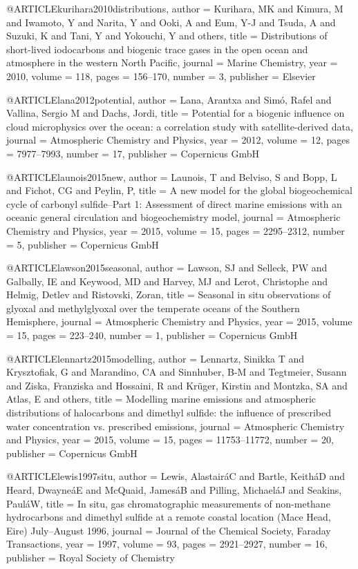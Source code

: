 @ARTICLE{kurihara2010distributions,
  author = {Kurihara, MK and Kimura, M and Iwamoto, Y and Narita, Y and Ooki,
	A and Eum, Y-J and Tsuda, A and Suzuki, K and Tani, Y and Yokouchi,
	Y and others},
  title = {Distributions of short-lived iodocarbons and biogenic trace gases
	in the open ocean and atmosphere in the western North Pacific},
  journal = {Marine Chemistry},
  year = {2010},
  volume = {118},
  pages = {156--170},
  number = {3},
  publisher = {Elsevier}
}

@ARTICLE{lana2012potential,
  author = {Lana, Arantxa and Sim{\'o}, Rafel and Vallina, Sergio M and Dachs,
	Jordi},
  title = {Potential for a biogenic influence on cloud microphysics over the
	ocean: a correlation study with satellite-derived data},
  journal = {Atmospheric Chemistry and Physics},
  year = {2012},
  volume = {12},
  pages = {7977--7993},
  number = {17},
  publisher = {Copernicus GmbH}
}

@ARTICLE{launois2015new,
  author = {Launois, T and Belviso, S and Bopp, L and Fichot, CG and Peylin,
	P},
  title = {A new model for the global biogeochemical cycle of carbonyl sulfide--Part
	1: Assessment of direct marine emissions with an oceanic general
	circulation and biogeochemistry model},
  journal = {Atmospheric Chemistry and Physics},
  year = {2015},
  volume = {15},
  pages = {2295--2312},
  number = {5},
  publisher = {Copernicus GmbH}
}

@ARTICLE{lawson2015seasonal,
  author = {Lawson, SJ and Selleck, PW and Galbally, IE and Keywood, MD and Harvey,
	MJ and Lerot, Christophe and Helmig, Detlev and Ristovski, Zoran},
  title = {Seasonal in situ observations of glyoxal and methylglyoxal over the
	temperate oceans of the Southern Hemisphere},
  journal = {Atmospheric Chemistry and Physics},
  year = {2015},
  volume = {15},
  pages = {223--240},
  number = {1},
  publisher = {Copernicus GmbH}
}

@ARTICLE{lennartz2015modelling,
  author = {Lennartz, Sinikka T and Krysztofiak, G and Marandino, CA and Sinnhuber,
	B-M and Tegtmeier, Susann and Ziska, Franziska and Hossaini, R and
	Kr{\"u}ger, Kirstin and Montzka, SA and Atlas, E and others},
  title = {Modelling marine emissions and atmospheric distributions of halocarbons
	and dimethyl sulfide: the influence of prescribed water concentration
	vs. prescribed emissions},
  journal = {Atmospheric Chemistry and Physics},
  year = {2015},
  volume = {15},
  pages = {11753--11772},
  number = {20},
  publisher = {Copernicus GmbH}
}

@ARTICLE{lewis1997situ,
  author = {Lewis, Alastair{\'a}C and Bartle, Keith{\'a}D and Heard, Dwayne{\'a}E
	and McQuaid, James{\'a}B and Pilling, Michael{\'a}J and Seakins,
	Paul{\'a}W},
  title = {In situ, gas chromatographic measurements of non-methane hydrocarbons
	and dimethyl sulfide at a remote coastal location (Mace Head, Eire)
	July--August 1996},
  journal = {Journal of the Chemical Society, Faraday Transactions},
  year = {1997},
  volume = {93},
  pages = {2921--2927},
  number = {16},
  publisher = {Royal Society of Chemistry}
}

